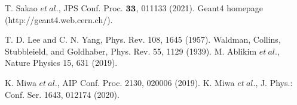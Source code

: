 \begin{thebibliography}{99}
 T. Sakao $et\ al.$, JPS Conf. Proc. $\bf{33}$, 011133 (2021).
Geant4 homepage (http://geant4.web.cern.ch/).



T. D. Lee and C. N. Yang, Phys. Rev. 108, 1645 (1957).
Waldman, Collins, Stubbleield, and Goldhaber, Phys. Rev. 55, 1129 (1939).
M. Ablikim $et\ al.$, Nature Physics 15, 631 (2019).

K. Miwa $et\ al.$, AIP Conf. Proc. 2130, 020006 (2019).
K. Miwa $et\ al.$, J. Phys.: Conf. Ser. 1643, 012174 (2020).


\begin{comment}


\bibitem{Oka-2000}M. Oka $et\ al.$, Prog. Theor. Phys. Sup. 137 (2000) 1.
\bibitem{Morimatsu-1984}O. Morimatsu, S. Ohta, K. Shimizu and K. Yazaki, Nucl. Phys. A420 (1984), 573.
\bibitem{Tani-1996}Y. Tani and M. Oka, Soryushiron-Kenkyu (Kyoto) 94 (1996), B39.






\bibitem{chiEFT-2005}J. Haidenbauer, U.-G. Mei$\ss$ner, Phys. Rev. C 72, 044005 (2005).

\bibitem{QCD-Nemura2019}H. Nemura et al., AIP Conf. Proc. 2130, 040005 (2019).




\bibitem{Lp-LOI}R. Honda $et\ al.$, Letter of Intent for an experiment at 50-GeV PS (2020)
\bibitem{Lp-1959}F.S. Crawford, Jr., M. Cresti, M.L. Good, F.T. Solmitz, M.L. Stevenson, and H.K. Ticho, Phys. Rev. Lett. 2, 174 (1959).
\bibitem{Lp-1961}G. Alexander, J.A. Anderson, F.S. Crawford, Jr., W. Laskar, and L.J. Lloyd, Phys. Rev. Lett. 7, 348 (1961).
\bibitem{Lp-1963}Thomas H. Groves, Phys. Rev. 129, 1372 (1963).
\bibitem{Lp-1964}B. Sechi-Zorn, R. A. Burnstein, T. B. Day, B. Kehoe, and G.A. Snow, Phys. Rev. Lett. 13, 282 (1964).


\bibitem{h3l}
\bibitem{he5l}

\bibitem{Aka-2020}Y. Akazawa $et\ al.$, Nucl. Inst. Meth. A1029, 166430, (2022).
\bibitem{KEK2}Y. Kondo et al., Nucl. Phys. A 676, 371 (2000).


\end{comment}
\end{thebibliography}
